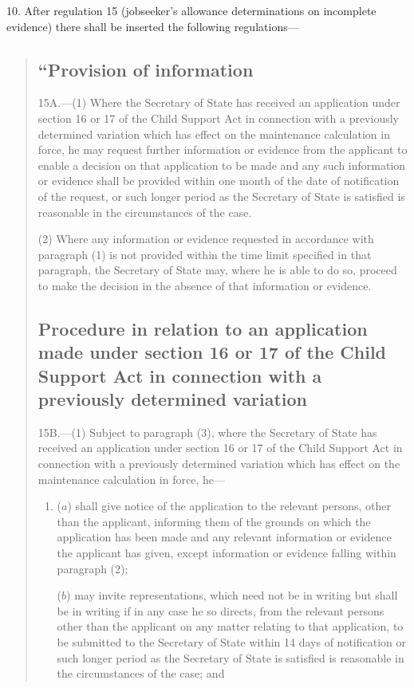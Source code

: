 \documentclass[12pt,a4paper]{article}
\begin{document}
10.  After regulation 15 (jobseeker’s allowance determinations on incomplete evidence) there shall be inserted the following regulations—
\begin{quotation}
\subsection*{“Provision of information}

15A.---(1)  Where the Secretary of State has received an application under section 16 or 17 of the Child Support Act in connection with a previously determined variation which has effect on the maintenance calculation in force, he may request further information or evidence from the applicant to enable a decision on that application to be made and any such information or evidence shall be provided within one month of the date of notification of the request, or such longer period as the Secretary of State is satisfied is reasonable in the circumstances of the case.

(2) Where any information or evidence requested in accordance with paragraph (1) is not provided within the time limit specified in that paragraph, the Secretary of State may, where he is able to do so, proceed to make the decision in the absence of that information or evidence.

\subsection*{\sloppy Procedure in relation to an application made under section 16 or 17 of the Child Support Act in connection with a previously determined variation}

15B.---(1)  Subject to paragraph (3), where the Secretary of State has received an application under section 16 or 17 of the Child Support Act in connection with a previously determined variation which has effect on the maintenance calculation in force, he—
\begin{enumerate}\item[]
($a$) shall give notice of the application to the relevant persons, other than the applicant, informing them of the grounds on which the application has been made and any relevant information or evidence the applicant has given, except information or evidence falling within paragraph (2);

($b$) may invite representations, which need not be in writing but shall be in writing if in any case he so directs, from the relevant persons other than the applicant on any matter relating to that application, to be submitted to the Secretary of State within 14 days of notification or such longer period as the Secretary of State is satisfied is reasonable in the circumstances of the case; and


\end{enumerate}
\end{quotation}
\end{document}

